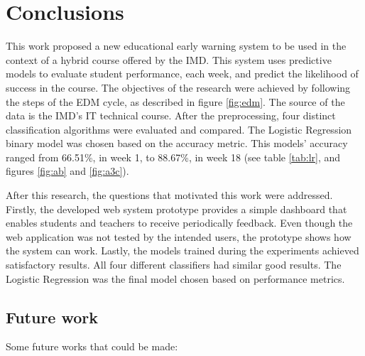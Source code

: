 \chapter{Conclusions}
\label{ch:Conclusions}

This work proposed a new educational early warning system to be used in the context of a hybrid course offered by the IMD. This system uses predictive models to evaluate student performance, each week, and predict the likelihood of success in the course. The objectives of the research were achieved by following the steps of the EDM cycle, as described in figure \ref{fig:edm}. The source of the data is the IMD's IT technical course. After the preprocessing, four distinct classification algorithms were evaluated and compared. The Logistic Regression binary model was chosen based on the accuracy metric. This models' accuracy ranged from 66.51\%, in week 1, to 88.67\%, in week 18 (see table \ref{tab:lr}, and figures \ref{fig:ab} and \ref{fig:a3c}).

After this research, the questions that motivated this work were addressed. Firstly, the developed web system prototype provides a simple dashboard that enables students and teachers to receive periodically feedback. Even though the web application was not tested by the intended users, the prototype shows how the system can work. Lastly, the models trained during the experiments achieved satisfactory results. All four different classifiers had similar good results. The Logistic Regression was the final model chosen based on performance metrics.

\section{Future work}

Some future works that could be made:

